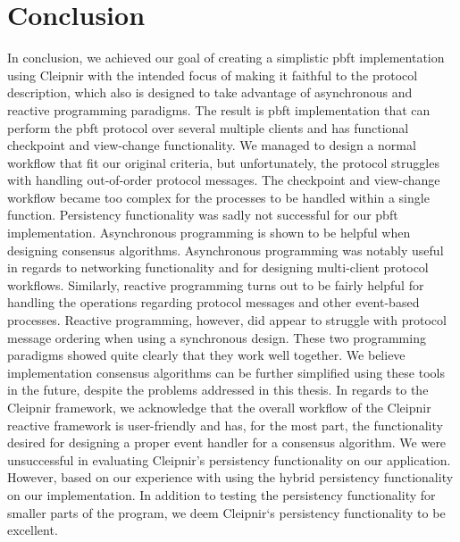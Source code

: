 \section{Conclusion}
\iffalse
In conclusion we achieved our goal of creating a \ac{pbft} implementation using Cleipnir with the intended focus of making it faithful to the protocol description which also takes advantage asynchronous and reactive programming paradigms.
Original goal: Our goal for this thesis is to use the Cleipnir framework to implement the Practical Byzantine Fault Tolerance (PBFT) consensus algorithm using functionality from both asynchronous programming and reactive programming. The desired PBFT implementation
\fi
In conclusion, we achieved our goal of creating a simplistic \ac{pbft} implementation using Cleipnir with the intended focus of making it faithful to the protocol description, which also is designed to take advantage of asynchronous and reactive programming paradigms. The result is \ac{pbft} implementation that can perform the \ac{pbft} protocol over several multiple clients and has functional checkpoint and view-change functionality. We managed to design a normal workflow that fit our original criteria, but unfortunately, the protocol struggles with handling out-of-order protocol messages. The checkpoint and view-change workflow became too complex for the processes to be handled within a single function. Persistency functionality was sadly not successful for our \ac{pbft} implementation. Asynchronous programming is shown to be helpful when designing consensus algorithms. Asynchronous programming was notably useful in regards to networking functionality and for designing multi-client protocol workflows.
Similarly, reactive programming turns out to be fairly helpful for handling the operations regarding protocol messages and other event-based processes. Reactive programming, however, did appear to struggle with protocol message ordering when using a synchronous design. These two programming paradigms showed quite clearly that they work well together. We believe implementation consensus algorithms can be further simplified using these tools in the future, despite the problems addressed in this thesis. In regards to the Cleipnir framework, we acknowledge that the overall workflow of the Cleipnir reactive framework is user-friendly and has, for the most part, the functionality desired for designing a proper event handler for a consensus algorithm. We were unsuccessful in evaluating Cleipnir’s persistency functionality on our application. However, based on our experience with using the hybrid persistency functionality on our implementation. In addition to testing the persistency functionality for smaller parts of the program, we deem Cleipnir`s persistency functionality to be excellent.
